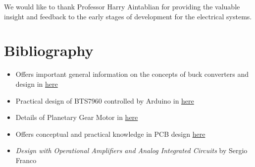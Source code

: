 \documentclass[a4paper, 10pt]{article}
\begin{document}
	We would like to thank Professor Harry Aintablian for providing the valuable insight and feedback to the early stages of development for the electrical systems. 

\section{Bibliography}
	\begin{itemize}
		\item Offers important general information on the concepts of buck converters and design in \href{https://www.electricaltechnology.org/2020/09/buck-converter.html}{here}

		
		\item Practical design of BTS7960 controlled by Arduino in \href{https://electropeak.com/learn/interfacing-bts7960-43a-high-power-motor-driver-module-with-arduino/} {here}
		
		
		\item Details of Planetary Gear Motor in \href{https://www.servocity.com/content/downloads/118_rpm_hd_precision_planetary_gearmotor_-_specifications_1.pdf} {here}
		
		
		\item Offers conceptual and practical knowledge in PCB design \href{https://www.wevolver.com/article/how-to-design-a-pcb-layout-a-comprehensive-guide} {here}
				
		
		\item \textit{Design with Operational Amplifiers and Analog Integrated Circuits} by Sergio Franco
		

\end{itemize}
\end{document}
